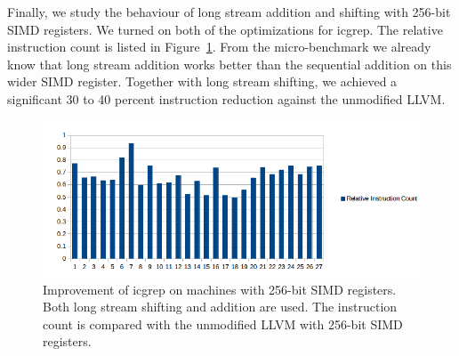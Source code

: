 Finally, we study the behaviour of long stream addition and shifting with 256-bit SIMD registers. We turned on both of the optimizations for icgrep. The relative instruction count is listed in Figure~\ref{fig:inst_count_all_256}. From the micro-benchmark we already know that long stream addition works better than the sequential addition on this wider SIMD register. Together with long stream shifting, we achieved a significant 30 to 40 percent instruction reduction against the unmodified LLVM.

\begin{figure}[htbp!]
\centering
\includegraphics[width=140mm]{draw/inst_count_all_256.png}
\caption[Improvement of icgrep on machines with 256-bit SIMD registers]{Improvement of icgrep on machines with 256-bit SIMD registers. Both long stream shifting and addition are used. The instruction count is compared with the unmodified LLVM with 256-bit SIMD registers.}
\label{fig:inst_count_all_256}
\end{figure}
